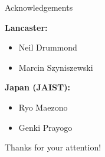 \documentclass[10pt, pdf, hyperref={draft}, usenames, dvipsnames]{beamer}
\begin{document}

\begin{frame}{Acknowledgements}

\begin{minipage}[t]{0.45\textwidth}
{\bf Lancaster:}
\begin{itemize}
  \item Neil Drummond
  \item Marcin Szyniszewski
\end{itemize}
\end{minipage}%
\hfill
\begin{minipage}[t]{0.45\textwidth}
{\bf Japan (JAIST):}
\begin{itemize}
  \item Ryo Maezono
  \item Genki Prayogo
\end{itemize}
\end{minipage}%
\vfill
\begin{center}
{\Large Thanks for your attention!}
\end{center}
\end{frame}

\end{document}
